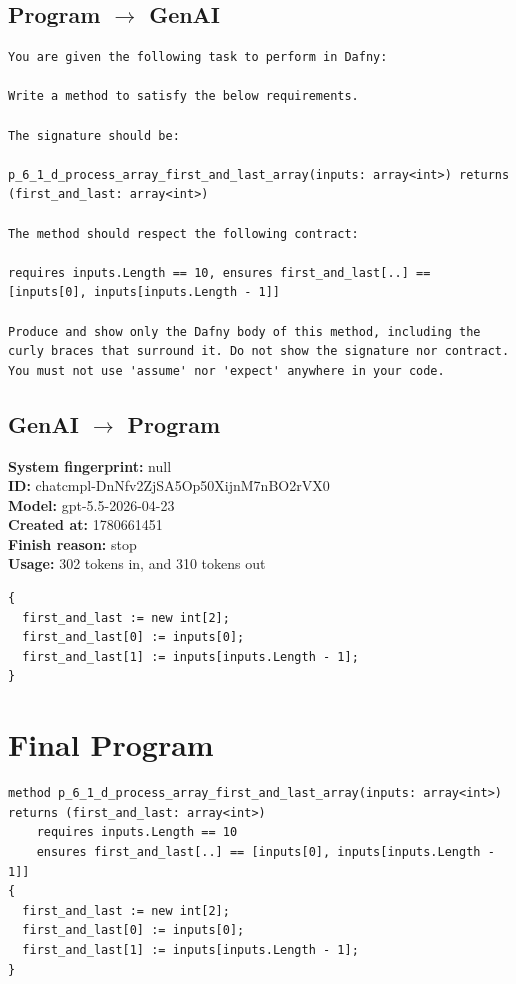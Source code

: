 \documentclass{article}
\begin{document}
\subsection*{Program $\rightarrow$ GenAI}
\begin{lstlisting}
You are given the following task to perform in Dafny:

Write a method to satisfy the below requirements.

The signature should be:

p_6_1_d_process_array_first_and_last_array(inputs: array<int>) returns (first_and_last: array<int>)

The method should respect the following contract:

requires inputs.Length == 10, ensures first_and_last[..] == [inputs[0], inputs[inputs.Length - 1]]

Produce and show only the Dafny body of this method, including the curly braces that surround it. Do not show the signature nor contract. You must not use 'assume' nor 'expect' anywhere in your code.
\end{lstlisting}
\subsection*{GenAI $\rightarrow$ Program}
\textbf{System fingerprint: }null
\\\textbf{ID: }chatcmpl-DnNfv2ZjSA5Op50XijnM7nBO2rVX0
\\\textbf{Model: }gpt-5.5-2026-04-23
\\\textbf{Created at: }1780661451
\\\textbf{Finish reason: }stop
\\\textbf{Usage: }302 tokens in, and 310 tokens out
\begin{lstlisting}
{
  first_and_last := new int[2];
  first_and_last[0] := inputs[0];
  first_and_last[1] := inputs[inputs.Length - 1];
}
\end{lstlisting}
\section*{Final Program}
\begin{lstlisting}
method p_6_1_d_process_array_first_and_last_array(inputs: array<int>) returns (first_and_last: array<int>)
	requires inputs.Length == 10
	ensures first_and_last[..] == [inputs[0], inputs[inputs.Length - 1]]
{
  first_and_last := new int[2];
  first_and_last[0] := inputs[0];
  first_and_last[1] := inputs[inputs.Length - 1];
}
\end{lstlisting}
\end{document}
